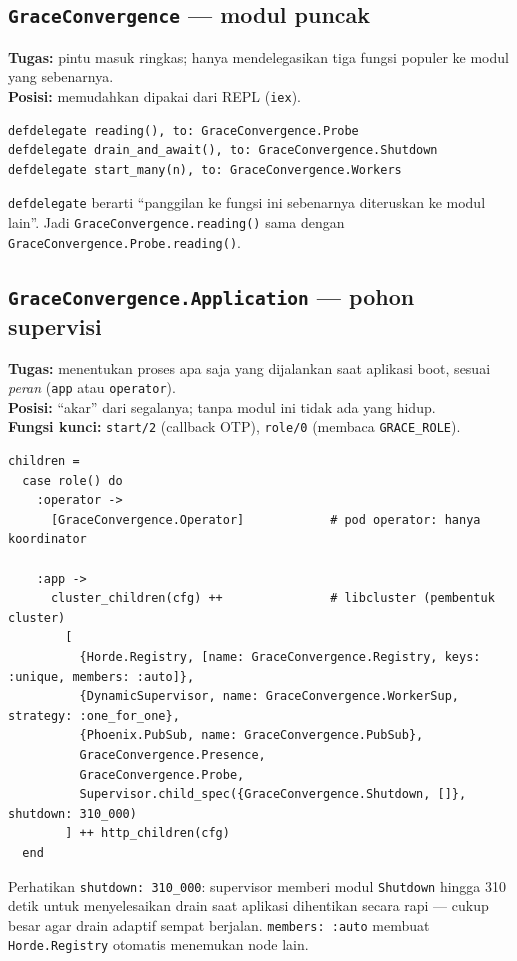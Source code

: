 \documentclass[11pt]{article}
\newcommand{\code}[1]{\texttt{\small #1}}
\begin{document}
\subsection{\texttt{GraceConvergence} --- modul puncak}
\textbf{Tugas:} pintu masuk ringkas; hanya mendelegasikan tiga fungsi populer ke modul yang
sebenarnya. \\
\textbf{Posisi:} memudahkan dipakai dari REPL (\code{iex}).
\begin{lstlisting}[style=ex]
defdelegate reading(), to: GraceConvergence.Probe
defdelegate drain_and_await(), to: GraceConvergence.Shutdown
defdelegate start_many(n), to: GraceConvergence.Workers
\end{lstlisting}
\code{defdelegate} berarti ``panggilan ke fungsi ini sebenarnya diteruskan ke modul lain''. Jadi
\code{GraceConvergence.reading()} sama dengan \code{GraceConvergence.Probe.reading()}.

\subsection{\texttt{GraceConvergence.Application} --- pohon supervisi}
\textbf{Tugas:} menentukan proses apa saja yang dijalankan saat aplikasi boot, sesuai \emph{peran}
(\code{app} atau \code{operator}). \\
\textbf{Posisi:} ``akar'' dari segalanya; tanpa modul ini tidak ada yang hidup. \\
\textbf{Fungsi kunci:} \code{start/2} (callback OTP), \code{role/0} (membaca \code{GRACE\_ROLE}).
\begin{lstlisting}[style=ex]
children =
  case role() do
    :operator ->
      [GraceConvergence.Operator]            # pod operator: hanya koordinator

    :app ->
      cluster_children(cfg) ++               # libcluster (pembentuk cluster)
        [
          {Horde.Registry, [name: GraceConvergence.Registry, keys: :unique, members: :auto]},
          {DynamicSupervisor, name: GraceConvergence.WorkerSup, strategy: :one_for_one},
          {Phoenix.PubSub, name: GraceConvergence.PubSub},
          GraceConvergence.Presence,
          GraceConvergence.Probe,
          Supervisor.child_spec({GraceConvergence.Shutdown, []}, shutdown: 310_000)
        ] ++ http_children(cfg)
  end
\end{lstlisting}
Perhatikan \code{shutdown: 310\_000}: supervisor memberi modul \code{Shutdown} hingga 310 detik untuk
menyelesaikan drain saat aplikasi dihentikan secara rapi --- cukup besar agar drain adaptif sempat
berjalan. \code{members: :auto} membuat \code{Horde.Registry} otomatis menemukan node lain.
\end{document}
